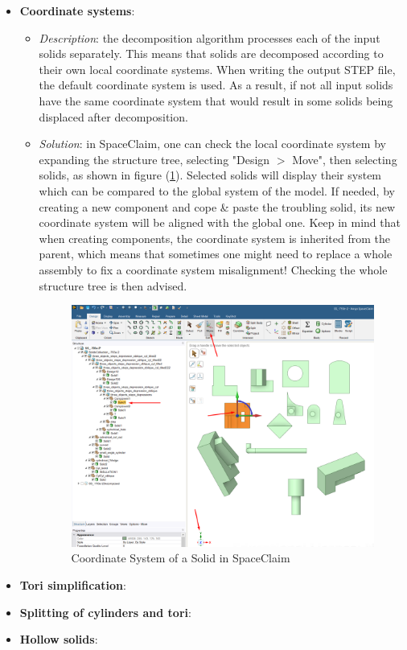 \documentclass[12pt, a4paper, titlepage]{article}
\begin{document}
\begin{itemize}
	\item \textbf{Coordinate systems}: 
	\begin{itemize}
		\item \emph{Description}: the decomposition algorithm processes each of the input solids separately. This means that solids are decomposed according to their own local coordinate systems. When writing the output STEP file, the default coordinate system is used. As a result, if not all input solids have the same coordinate system that would result in some solids being displaced after decomposition.
		\item \emph{Solution}: in SpaceClaim, one can check the local coordinate system by expanding the structure tree, selecting "Design $>$ Move", then selecting solids, as shown in figure (\ref{fig:Solid Coord}). Selected solids will display their system which can be compared to the global system of the model. If needed, by creating a new component and cope \& paste the troubling solid, its new coordinate system will be aligned with the global one. Keep in mind that when creating components, the coordinate system is inherited from the parent, which means that sometimes one might need to replace a whole assembly to fix a coordinate system misalignment! Checking the whole structure tree is then advised. 
		\begin{figure}[h!]
			\centering
			\includegraphics[scale=0.4]{figures/issue_Coordinates.png}
			\caption{Coordinate System of a Solid in SpaceClaim}
			\label{fig:Solid Coord}
		\end{figure}
	\end{itemize}
	\item \textbf{Tori simplification}: 
	\item \textbf{Splitting of cylinders and tori}:
	\item \textbf{Hollow solids}:
\end{itemize}
\end{document}

